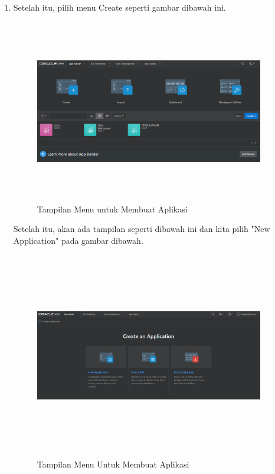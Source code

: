 \documentclass[a4paper, 12pt]{article}
\begin{document}
\begin{enumerate}
\item Setelah itu, pilih menu Create seperti gambar dibawah ini. 

            \begin{figure}[!htbp]
            \centering
            \includegraphics[width=10cm,height=8cm]{gambar/1-createapp.PNG}
            \caption{Tampilan Menu untuk Membuat Aplikasi}
            \label{penanda}
            \end{figure}
            
\par Setelah itu, akan ada tampilan seperti dibawah ini dan kita pilih "New Application" pada gambar dibawah. 

            \begin{figure}[!htbp]
            \centering
            \includegraphics[width=10cm,height=9cm]{gambar/2-createapp.PNG}
            \caption{Tampilan Menu Untuk Membuat Aplikasi }
            \label{penanda}
            \end{figure}


\end{enumerate}
\end{document}
